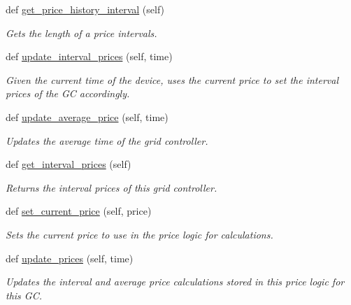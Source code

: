 \begin{DoxyCompactItemize}
def \hyperlink{class_build_1_1_objects_1_1grid__controller_1_1_grid_controller_price_logic_a58470569ce8fe9ce1907e3f8784426a5}{get\+\_\+price\+\_\+history\+\_\+interval} (self)
\begin{DoxyCompactList}\small\item\em Gets the length of a price intervals. \end{DoxyCompactList}\item 
def \hyperlink{class_build_1_1_objects_1_1grid__controller_1_1_grid_controller_price_logic_a9c0d6f8e499488e3ae75ad3779876cfd}{update\+\_\+interval\+\_\+prices} (self, time)
\begin{DoxyCompactList}\small\item\em Given the current time of the device, uses the current price to set the interval prices of the GC accordingly. \end{DoxyCompactList}\item 
def \hyperlink{class_build_1_1_objects_1_1grid__controller_1_1_grid_controller_price_logic_a241ac9f19af131870e9bad6dd2b3cbc3}{update\+\_\+average\+\_\+price} (self, time)
\begin{DoxyCompactList}\small\item\em Updates the average time of the grid controller. \end{DoxyCompactList}\item 
def \hyperlink{class_build_1_1_objects_1_1grid__controller_1_1_grid_controller_price_logic_a4448f422b18640d1d00b1b43cc73d149}{get\+\_\+interval\+\_\+prices} (self)
\begin{DoxyCompactList}\small\item\em Returns the interval prices of this grid controller. \end{DoxyCompactList}\item 
def \hyperlink{class_build_1_1_objects_1_1grid__controller_1_1_grid_controller_price_logic_a83a87f838ab54ca0dbd4cb3924994c7b}{set\+\_\+current\+\_\+price} (self, price)
\begin{DoxyCompactList}\small\item\em Sets the current price to use in the price logic for calculations. \end{DoxyCompactList}\item 
def \hyperlink{class_build_1_1_objects_1_1grid__controller_1_1_grid_controller_price_logic_a8772b6c6be3c37e2249c257f8ac5e82a}{update\+\_\+prices} (self, time)
\begin{DoxyCompactList}\small\item\em Updates the interval and average price calculations stored in this price logic for this GC. \end{DoxyCompactList}\item 

\end{DoxyCompactItemize}
